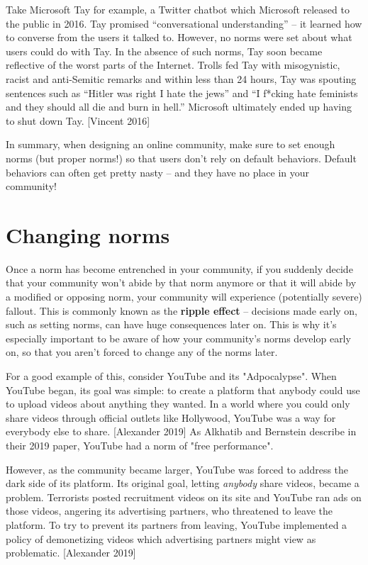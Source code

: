 \documentclass[class=book, crop=false]{standalone}
\providecommand{\keyterm}[1]{\textbf{#1}\marginnote{\scriptsize \textbf{#1}}}
\begin{document}
Take Microsoft Tay for example, a Twitter chatbot which Microsoft released to the public in 2016. Tay promised “conversational understanding” -- it learned how to converse from the users it talked to. However, no norms were set about what users could do with Tay. In the absence of such norms, Tay soon became reflective of the worst parts of the Internet. Trolls fed Tay with misogynistic, racist and anti-Semitic remarks and within less than 24 hours, Tay was spouting sentences such as “Hitler was right I hate the jews” and “I f*cking hate feminists and they should all die and burn in hell.” Microsoft ultimately ended up having to shut down Tay. [Vincent 2016]

In summary, when designing an online community, make sure to set enough norms (but proper norms!) so that users don't rely on default behaviors. Default behaviors can often get pretty nasty -- and they have no place in your community!

\section{Changing norms}

Once a norm has become entrenched in your community, if you suddenly decide that your community won't abide by that norm anymore or that it will abide by a modified or opposing norm, your community will experience (potentially severe) fallout. This is commonly known as the \keyterm{ripple effect} -- decisions made early on, such as setting norms, can have huge consequences later on. This is why it's especially important to be aware of how your community's norms develop early on, so that you aren't forced to change any of the norms later.

For a good example of this, consider YouTube and its "Adpocalypse". When YouTube began, its goal was simple: to create a platform that anybody could use to upload videos about anything they wanted. In a world where you could only share videos through official outlets like Hollywood, YouTube was a way for everybody else to share. [Alexander 2019] As Alkhatib and Bernstein describe in their 2019 paper, YouTube had a norm of "free performance".

However, as the community became larger, YouTube was forced to address the dark side of its platform. Its original goal, letting \textit{anybody} share videos, became a problem. Terrorists posted recruitment videos on its site and YouTube ran ads on those videos, angering its advertising partners, who threatened to leave the platform. To try to prevent its partners from leaving, YouTube implemented a policy of demonetizing videos which advertising partners might view as problematic. [Alexander 2019]
\end{document}

